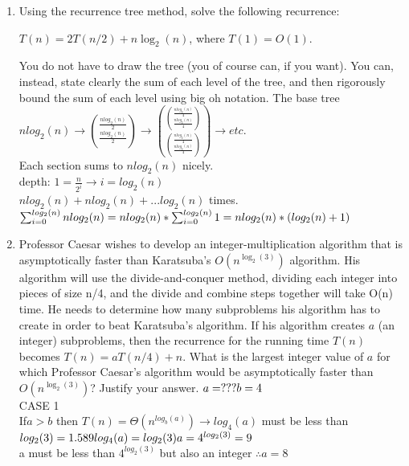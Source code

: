 \documentclass[11pt]{amsart}
\begin{document}
\begin{enumerate}
\item Using the recurrence tree method, solve the following recurrence:
\begin{center}
$T(n) = 2T(n/2) + n\log_2(n)$, where $T(1) = O(1)$.
\end{center}
You do not have to draw the tree (you of course can, if you want). You can, instead, state clearly the sum of each level of the tree, and then rigorously bound the sum of each level using big oh notation.
\subitem The base tree\\$nlog_2(n)\rightarrow\binom{\frac{nlog_2(n)}{2}}{\frac{nlog_2(n)}{2}}\rightarrow\binom{\binom{\frac{nlog_2(n)}{4}}{\frac{nlog_2(n)}{4}}}{\binom{\frac{nlog_2(n)}{4}}{\frac{nlog_2(n)}{4}}}\rightarrow etc.$\\Each section sums to $nlog_2(n)$ nicely.\\depth: $1 = \frac{n}{2^i}\rightarrow i=log_2(n)$\\$nlog_2(n)+nlog_2(n)+... log_2(n)$ times.\\$\sum_{i = 0}^{log_2(n)}nlog_2(n)\\=nlog_2(n)*\sum_{i=0}^{log_2(n)}1\\=nlog_2(n)*(log_2(n)+1)$  


\bigskip

\item Professor Caesar wishes to develop an integer-multiplication algorithm that is asymptotically faster than Karatsuba’s $O(n^{\log_2(3)})$ algorithm. His algorithm will use the divide-and-conquer method, dividing each integer into pieces of size n/4, and the divide and combine steps together will take O(n) time. He needs to determine how many subproblems his algorithm has to create in order to beat Karatsuba’s algorithm. If his algorithm creates $a$ (an integer) subproblems, then the recurrence for the running time $T(n)$ becomes $T(n) = aT(n/4) + n$. What is the largest integer value of $a$ for which Professor Caesar’s algorithm would be asymptotically faster than $O(n^{\log_2(3)})$? Justify your answer.
\subitem $a = ???\\b = 4$\\CASE 1\\If$a>b$ then $T(n) = \Theta (n^{log_b(a)})\rightarrow log_4(a)$ must be less than $log_2(3)=1.589\\log_4(a)=log_2(3)\\a=4^{log_2(3)}=9$\\a must be less than $4^{log_2(3)}$ but also an integer $\therefore a = 8$
\end{enumerate}


\bigskip
\end{document}
